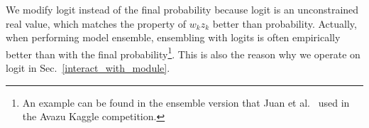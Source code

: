 We modify logit instead of the final probability because logit is an unconstrained real value, which matches the property of $w_k z_k$ better than probability.
Actually, when performing model ensemble,
ensembling with logits is often empirically better than with the final probability\footnote{
An example can be found in the ensemble version that Juan et al.~ used in the Avazu Kaggle competition.
}.
This is also the reason why we operate on logit %
in Sec.~\ref{interact_with_module}.
